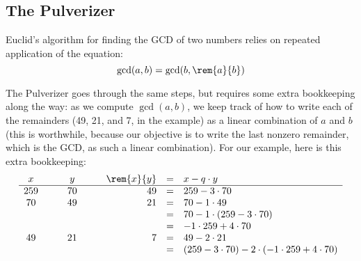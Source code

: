 \documentclass[handout]{mcs}
\begin{document}
{\iffalse

\begin{corollary*}
If $k$ and $n$ are relatively prime, then $k^{\phi(n)-1}$ is an inverse
modulo $n$ of $k$.
\end{corollary*}

\textbf{Remark:} Using fast exponentiation to compute $k^{\phi(n)-1}$ is
another efficient way to compute an inverse modulo $n$ of $k$.
\fi

\subsection*{The Pulverizer}

Euclid's algorithm for finding the GCD of two numbers relies on
repeated application of the equation: 
\[
\gcd(a, b) = \gcd(b, \rem{a}{b})
\]
\iffalse
For example, we can compute the GCD of 259 and 70 as follows:
\[
\begin{array}{rclcl}
\gcd(259, 70)
    & = & \gcd(70, 49) & \quad & \text{since $\rem{259}{70} = 49$}\\
    & = & \gcd(49, 21) && \text{since $\rem{70}{49} = 21$} \\
    & = & \gcd(21, 7) && \text{since $\rem{49}{21} = 7$} \\
    & = & \gcd(7, 0) && \text{since $\rem{21}{7} = 0$} \\
    & = & 7.
\end{array}
\]
\fi
The Pulverizer goes through the same steps, but requires some extra
bookkeeping along the way: as we compute $\gcd(a, b)$, we keep track
of how to write each of the remainders (49, 21, and 7, in the example)
as a linear combination of $a$ and $b$ (this is worthwhile, because
our objective is to write the last nonzero remainder, which is the
GCD, as such a linear combination).  For our example, here is this
extra bookkeeping:
\[
\begin{array}{ccccrcl}
x & \quad & y & \quad & \rem{x}{y} & = & x - q \cdot y \\ \hline
259 && 70 && 49 & = &   259 - 3 \cdot 70 \\
70 && 49 && 21  & = &   70 - 1 \cdot 49 \\
&&&&            & = &   70 - 1 \cdot (259 - 3 \cdot 70) \\
&&&&            & = &   -1 \cdot 259 + 4 \cdot 70 \\
49 && 21 && 7   & = &   49 - 2 \cdot 21 \\
&&&&            & = &   (259 - 3 \cdot 70) -
                                2 \cdot (-1 \cdot 259 + 4 \cdot 70) \\

\end{array}\]}
\end{document}
